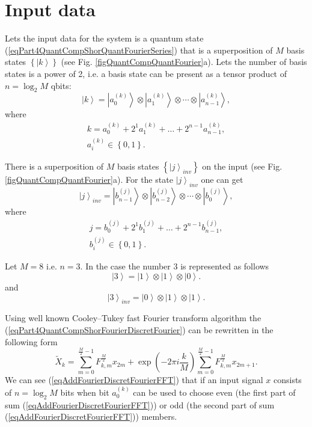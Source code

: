 \documentclass{llncs}
\begin{document}
\section{Input data}

Lets the input data for the system is a quantum state 
(\ref{eqPart4QuantCompShorQuantFourierSeries}) that is a superposition
of $M$ basis states $\left\{\left|k\right>\right\}$ 
(see Fig. \ref{figQuantCompQuantFourier}a). 
Lets the number of basis states is a power of 2, i.e. a basis state
can be present as a tensor product of 
$n = \log_2{M}$ qbits:
\begin{equation}
\left|k\right> = \left|a^{(k)}_0\right> \otimes  \left|a^{(k)}_1\right>
\otimes \cdots \otimes \left|a^{(k)}_{n-1}\right>, 
\nonumber
\end{equation}
where
\begin{eqnarray}
k = a^{(k)}_0 + 2^1 a^{(k)}_1 + \dots + 2^{n-1} a^{(k)}_{n-1},
\nonumber \\
a^{(k)}_i \in \left\{0, 1\right\}.
\nonumber
\end{eqnarray}

There is a superposition of $M$ basis states 
$\left\{\left|j\right>_{inv}\right\}$ on the input
(see Fig. \ref{figQuantCompQuantFourier}a).
For the state
$\left|j\right>_{inv}$ one can get 
\begin{equation}
\left|j\right>_{inv} = \left|b^{(j)}_{n-1}\right> \otimes
\left|b^{(j)}_{n-2}\right> 
\otimes \cdots \otimes \left|b^{(j)}_{0}\right>, 
\nonumber
\end{equation}
where
\begin{eqnarray}
j = b^{(j)}_0 + 2^1 b^{(j)}_1 + \dots + 2^{n-1} b^{(j)}_{n-1},
\nonumber \\
b^{(j)}_i \in \left\{0, 1\right\}.
\nonumber
\end{eqnarray}

\begin{example}
  \label{exInputData}
  Let $M=8$ i.e. $n=3$. In the case the number 3 is represented as
  follows
  \[
  \left|3\right> = \left|1\right> \otimes  \left|1\right>
  \otimes  \left|0\right>.
  \]
  and
  \[
  \left|3\right>_{inv} = \left|0\right> \otimes  \left|1\right>
  \otimes  \left|1\right>.
  \]
\end{example}


Using well known Cooley–Tukey fast Fourier transform algorithm
\cite{fft} the (\ref{eqPart4QuantCompShorFourierDiscretFourier}) can be
rewritten in the following form
\begin{equation}
\tilde{X}_k = \sum^{\frac{M}{2} - 1}_{m = 0} F_{k,m}^{\frac{M}{2}} x_{2m} +
\exp{\left(-2\pi i \frac{k}{M}\right)}
\sum^{\frac{M}{2} - 1}_{m = 0}  F_{k,m}^{\frac{M}{2}} x_{2m + 1}.
\label{eqAddFourierDiscretFourierFFT}
\end{equation}
We can see (\ref{eqAddFourierDiscretFourierFFT}) that if an
input signal $x$ consists of $n = \log_2{M}$ 
bits when bit $a^{(k)}_0$ can be used to choose even 
(the first part of sum (\ref{eqAddFourierDiscretFourierFFT}))
or odd
(the second part of sum (\ref{eqAddFourierDiscretFourierFFT}))
members. 
\end{document}
